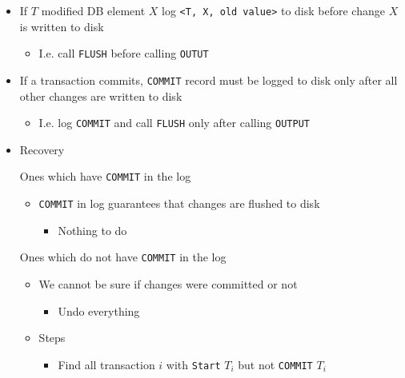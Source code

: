 \begin{itemize}
        \begin{itemize}
            \item If $T$ modified DB element $X$ log \verb+<T, X, old value>+ to disk before change $X$ is written to disk
                \begin{itemize}
                    \item I.e. call \verb+FLUSH+ before calling \verb+OUTUT+
                \end{itemize}
            \item If a transaction commits, \verb+COMMIT+ record must be logged to disk only after all other changes are written to disk
                \begin{itemize}
                    \item I.e. log \verb+COMMIT+ and call \verb+FLUSH+ only after calling \verb+OUTPUT+
                \end{itemize}
            \item Recovery
                \begin{itemize}
                     Ones which have \verb+COMMIT+ in the log
                        \begin{itemize}
                            \item \verb+COMMIT+ in log guarantees that changes are flushed to disk
                                \begin{itemize}
                                    \item Nothing to do
                                \end{itemize}
                        \end{itemize}
                     Ones which do not have \verb+COMMIT+ in the log
                        \begin{itemize}
                            \item We cannot be sure if changes were committed or not
                                \begin{itemize}
                                    \item Undo everything
                                \end{itemize}
                            \item Steps
                                \begin{itemize}
                                    \item Find all transaction $i$ with \verb+Start+ $T_i$ but not \verb+COMMIT+ $T_i$

\end{itemize}
\end{itemize}
\end{itemize}
\end{itemize}
\end{itemize}
